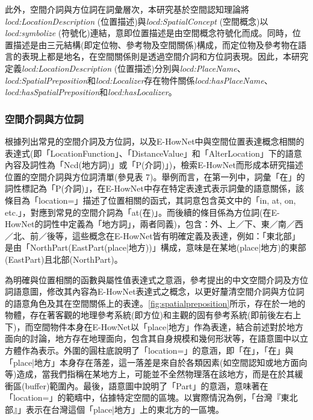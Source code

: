 此外，空間介詞與方位詞在詞彙層次，本研究基於空間認知理論將\textit{locd:LocationDescription} (位置描述)與\textit{locd:SpatialConcept} (空間概念)以\textit{locd:symbolize} (符號化)連結，意即位置描述是由空間概念符號化而成。同時，位置描述是由三元結構(即定位物、參考物及空間關係)構成，而定位物及參考物在語言的表現上都是地名，在空間關係則是透過空間介詞和方位詞表現。因此，本研究定義\textit{locd:LocationDescription} (位置描述)分別與\textit{locd:PlaceName}、\textit{locd:SpatialPreposition}和\textit{locd:Localizer}存在物件關係\textit{locd:hasPlaceName}、\textit{locd:hasSpatialPreposition}和\textit{locd:hasLocalizer}。

\subsubsection{空間介詞與方位詞}

根據\citet{RN45}列出常見的空間介詞及方位詞，以及E-HowNet中與空間位置表達概念相關的表達式(即「LocationFunction」、「DistanceValue」和「AlterLocation」下的語意內容及詞性為「Ncd(地方詞)」或「P(介詞)」)，檢索E-HowNet而形成本研究描述位置的空間介詞與方位詞清單(參見表 7)。舉例而言，在第一列中，詞彙「在」的詞性標記為「P(介詞)」，在E-HowNet中存在特定表達式表示詞彙的語意關係，該條目為「location={}」描述了位置相關的函式，其詞意包含英文中的「in, at, on, etc.」，對應到常見的空間介詞為「at(在)」。而後續的條目係為方位詞(在E-HowNet的詞性中定義為「地方詞」，兩者同義)，包含：外、上／下、東／南／西／北、前／後等，這些概念在E-HowNet皆有明確定義及表達，例如：「東北部」是由「{NorthPart({EastPart({place|地方})})}」構成，意味是在某地(place|地方)的東部(EastPart)且北部(NorthPart)。

為明確與位置相關的函數與屬性值表達式之意涵，參考\citet{RN45}提出的中文空間介詞及方位詞語意圖，修改其內容為E-HowNet表達式之概念，以更好釐清空間介詞與方位詞的語意角色及其在空間關係上的表達。\ref{fig:spatialpreposition}所示，存在於一地的物體，存在著客觀的地理參考系統(即方位)和主觀的固有參考系統(即前後左右上下)，而空間物件本身在E-HowNet以「place|地方」作為表達，結合前述對於地方面向的討論，地方存在地理面向，包含其自身規模和幾何形狀等，在語意圖中以立方體作為表示。外圍的圓柱底說明了「location={}」的意涵，即「在」，「在」與「place|地方」本身存在落差，這一落差是來自於各類因素(如空間認知或地方面向等)造成，當我們指稱在某地方上，可能並不全然物理落在該地方，而是在於其緩衝區(buffer)範圍內。最後，語意圖中說明了「Part」的意涵，意味著在「location={}」的範疇中，佔據特定空間的區塊。以實際情況為例，「台灣『東北部』」表示在台灣這個「place|地方」上的東北方的一區塊。

